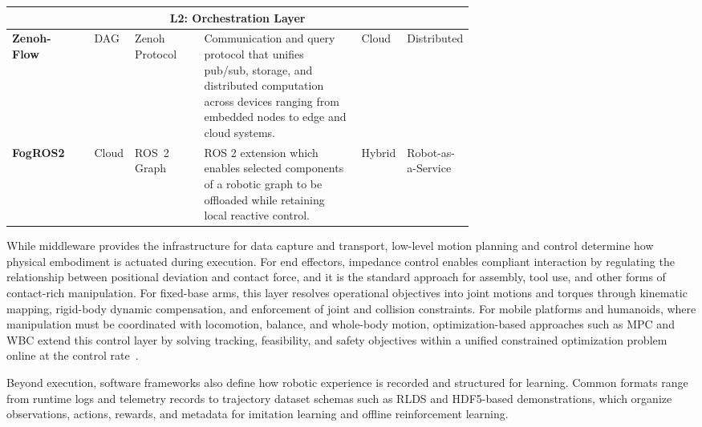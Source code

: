 \documentclass[acmsmall,screen,review]{acmart}
\begin{document}
\begin{table}[t]
\begin{tabular}{
  l
  l
  p{0.15\linewidth}
  p{0.34\linewidth}
  p{0.06\linewidth}
  p{0.12\linewidth}
}
\midrule
\multicolumn{6}{c}{\textbf{L2: Orchestration Layer}} \\
\midrule

\textbf{Zenoh-Flow}~\cite{baldoni2023zenohflow} &
DAG &
Zenoh Protocol &
Communication and query protocol that unifies pub/sub, storage, and distributed computation across devices ranging from embedded nodes to edge and cloud systems. &
Cloud &
Distributed \\

\textbf{FogROS2}~\cite{ichnowski2022fogros2} &
Cloud &
ROS~2 Graph &
ROS 2 extension which enables selected components of a robotic graph to be offloaded while retaining local reactive control. &
Hybrid &
Robot-as-a-Service \\


\bottomrule
\end{tabular}
\end{table}

While middleware provides the infrastructure for data capture and transport, low-level motion planning and control determine how physical embodiment is actuated during execution. 
For end effectors, impedance control enables compliant interaction by regulating the relationship between positional deviation and contact force, and it is the standard approach for assembly, tool use, and other forms of contact-rich manipulation. 
For fixed-base arms, this layer resolves operational objectives into joint motions and torques through kinematic mapping, rigid-body dynamic compensation, and enforcement of joint and collision constraints.
For mobile platforms and humanoids, where manipulation must be coordinated with locomotion, balance, and whole-body motion, optimization-based approaches such as MPC and WBC extend this control layer by solving tracking, feasibility, and safety objectives within a unified constrained optimization problem online at the control rate~\cite{schulman2014optimizing}.

Beyond execution, software frameworks also define how robotic experience is recorded and structured for learning. 
Common formats range from runtime logs and telemetry records to trajectory dataset schemas such as RLDS and HDF5-based demonstrations, which organize observations, actions, rewards, and metadata for imitation learning and offline reinforcement learning.
\end{document}
